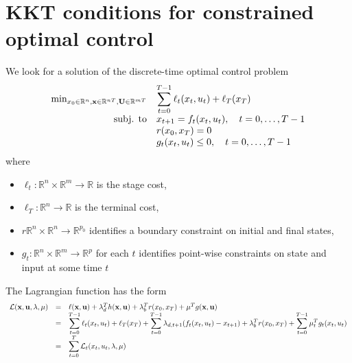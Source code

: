 \documentclass{book}
\newcommand{\R}{\mathbb{R}}
\theoremstyle{definition}
\theoremstyle{remark}
\theoremstyle{remark}
\begin{document}
\section{KKT conditions for constrained optimal control}
We look for a solution of the discrete-time optimal control problem
\[
    \begin{array}{r l}
        \min_{x_0\in\R^n,\mathbf{x}\in\R^{nT},\mathbf{U}\in\R^{mT}} & \displaystyle\sum_{t=0}^{T-1}\ell_t(x_t,u_t)+\ell_T(x_T) \\
        \text{subj. to} & x_{t+1} = f_t(x_t,u_t), \quad t=0,\dots,T-1\\
                        & r(x_0,x_T) = 0 \\
                        & g_t(x_t,u_t)\leq 0 ,\quad t=0,\dots,T-1
    \end{array}
\]
where 
\begin{itemize}
    \item $\ell_t:\R^n\times\R^m\to\R$ is the stage cost,
    \item $\ell_T:\R^n\to\R$ is the terminal cost,
    \item $r\R^n\times\R^n\to\R^{p_0}$ identifies a boundary constraint on initial and final states,
    \item $g_t:\R^n\times\R^m\to\R^p$ for each $t$ identifies point-wise constraints on state and input at some time $t$
\end{itemize}
The Lagrangian function has the form 
\begin{gather*}
    \begin{array}{r c l}
        \mathcal{L}(\mathbf{x},\mathbf{u},\mathbf{\lambda},\mathbf{\mu}) &=& \ell(\mathbf{x},\mathbf{u})+\mathbf{\lambda}_d^T h(\mathbf{x},\mathbf{u})+ \lambda_b^T r(x_0,x_T) + \mathbf{\mu}^Tg(\mathbf{x},\mathbf{u}) \\ 
                                                                         &=&\displaystyle\sum_{t=0}^{T-1}\ell_t(x_t,u_t)+\ell_T(x_T) + \displaystyle\sum_{t=0}^{T-1}\lambda_{d,t+1}(f_t(x_t,u_t)-x_{t+1})+\lambda_b^Tr(x_0,x_T) + \displaystyle\sum_{t=0}^{T-1}\mu_t^Tg_t(x_t,u_t)\\
                                                                         &=&\displaystyle\sum_{t=0}^{T}\mathcal{L}_t(x_t,u_t,\mathbf{\lambda},\mathbf{\mu})
    \end{array}
\end{gather*}

\end{document}
